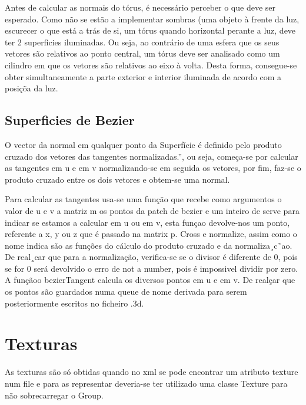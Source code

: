 Antes de calcular as normais do tórus, é necessário perceber o que deve ser esperado. Como não se estão a implementar sombras (uma objeto à frente da luz, escurecer o que está a trás de si, um tórus quando horizontal perante a luz, deve ter 2 superficies iluminadas. Ou seja, ao contrário de uma esfera que os seus vetores são relativos ao ponto central, um tórus deve ser analisado como um cilindro em que os vetores são relativos ao eixo à volta. Desta forma, consegue-se obter simultaneamente a parte exterior e interior
iluminada de acordo com a posiçõa da luz.


\subsection{Superficies de Bezier}

O vector da normal em qualquer ponto da Superfície é definido pelo produto cruzado dos vetores das tangentes normalizadas.”, ou seja, começa-se por calcular as tangentes em u e em v normalizando-se em seguida os vetores, por fim, faz-se o produto cruzado entre os dois vetores e obtem-se uma normal.


Para calcular as tangentes usa-se uma função que recebe como argumentos o valor de u e v a matriz m os pontos da patch de bezier e um inteiro de serve para indicar se estamos a calcular em u ou em v, esta funçao devolve-nos um ponto, referente a x, y ou z que é passado na matrix p.
Cross e normalize, assim como o nome indica são as funções do cálculo do produto cruzado e da normaliza¸c˜ao. De real¸car que para a normalização, verifica-se se o divisor é diferente de 0, pois se for 0 será devolvido o erro de not a number, pois é impossivel dividir por zero.
A funçãoo bezierTangent calcula os diversos pontos em u e em v. De realçar que os pontos são guardados numa queue de nome derivada para serem posteriormente escritos no ficheiro .3d.



\section{Texturas}


As texturas são só obtidas quando no xml se pode encontrar um atributo texture num file e para as representar deveria-se ter utilizado uma classe Texture para não sobrecarregar o Group.
